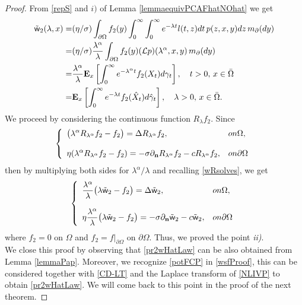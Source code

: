 \documentclass[11pt,a4paper]{article}
\begin{document}
\begin{proof}
From \eqref{repS} and $i)$ of Lemma \ref{lemmaequivPCAFhatNOhat} we get
\begin{align}
\tilde{\mathsf{w}}_2 (\lambda, x)  
= & (\eta/\sigma) \int_{\partial \Omega} f_2(y) \int_0^\infty \int_0^\infty e^{-\lambda t} l(t,z) dt\, p(z,x,y)dz\, m_\partial(dy)\notag \\
= & (\eta/\sigma) \frac{\lambda^\alpha}{\lambda} \int_{\partial \Omega} f_2(y) (\mathcal{L}p)(\lambda^\alpha ,x,y)\, m_\partial(dy) \label{wsfProof}\\
= & \frac{\lambda^\alpha}{\lambda} \mathbf{E}_x \left[\int_0^\infty e^{-\lambda^\alpha t} f_2(X_t) d\gamma_t \right], \quad t>0,\, x \in \bar{\Omega} \notag\\
= & \mathbf{E}_x\left[ \int_0^\infty e^{-\lambda t} f_2(\hat{X}_t) d\hat{\gamma}_t \right], \quad \lambda >0,\, x \in \bar{\Omega}. \notag
\end{align}
We proceed by considering the continuous function $R_\lambda f_2$. Since
\begin{equation*}
\left\lbrace
\begin{array}{ll}
\displaystyle \big( \lambda^\alpha R_{\lambda^\alpha} f_2 - f_2 \big) = \Delta  R_{\lambda^\alpha} f_2, & \textrm{on } \Omega,\\
\\
\displaystyle \eta (\lambda^\alpha R_{\lambda^\alpha} f_2 - f_2) = -\sigma \partial_{\bf n} R_{\lambda^\alpha} f_2 - c R_{\lambda^\alpha} f_2, & \textrm{on }  \partial\Omega
\end{array}
\right.
\end{equation*}
then by multiplying both sides for $\lambda^{\alpha}/\lambda$ and recalling \eqref{wRsolves}, we get
\begin{equation*}
\left\lbrace
\begin{array}{ll}
\displaystyle \frac{\lambda^\alpha}{\lambda} \big( \lambda \tilde{\mathsf{w}}_2 - f_2 \big) = \Delta \tilde{\mathsf{w}}_2, &  \textrm{on } \Omega,\\
\\
\displaystyle \eta \frac{\lambda^\alpha}{\lambda} \big( \lambda \tilde{\mathsf{w}}_2 - f_2 \big) = - \sigma \partial_{\bf n}\tilde{\mathsf{w}}_2 - c \tilde{\mathsf{w}}_2, & \textrm{on } \partial\Omega
\end{array}
\right.
\end{equation*}
where $f_2=0$ on $\Omega$ and $f_2 = f|_{\partial \Omega}$ on $\partial \Omega$. Thus, we proved the point \textit{ii)}.\\

We close this proof by observing that \eqref{pr2wHatLaw} can be also obtained  from Lemma \ref{lemmaPap}. Moreover, we recognize \eqref{potFCP} in \eqref{wsfProof}, this can be considered together with \eqref{CD-LT} and the Laplace transform of \eqref{NLIVP} to obtain \eqref{pr2wHatLaw}. We will come back to this point in the proof of the next theorem.

\end{proof}
\end{document}
